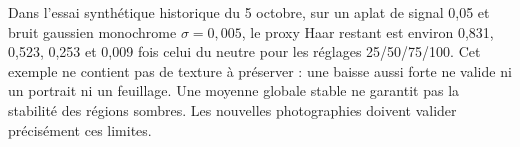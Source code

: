 Dans l'essai synthétique historique du 5 octobre, sur un aplat de signal 0,05 et bruit gaussien monochrome
$\sigma=0{,}005$, le proxy Haar restant est environ 0,831, 0,523, 0,253
et 0,009 fois celui du neutre pour les réglages 25/50/75/100. Cet exemple
ne contient pas de texture à préserver : une baisse aussi forte ne valide
ni un portrait ni un feuillage. Une moyenne globale stable ne garantit pas
la stabilité des régions sombres. Les nouvelles photographies doivent
valider précisément ces limites.



